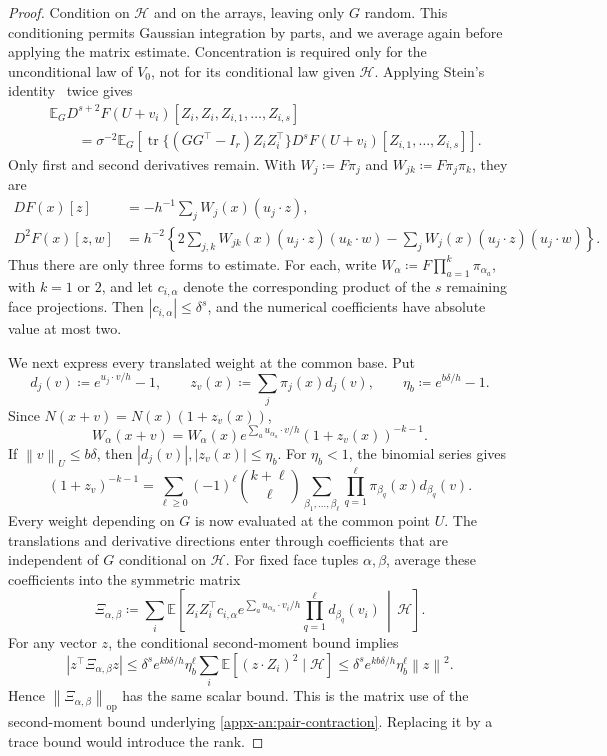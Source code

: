 \documentclass[11pt,letterpaper]{article}
\theoremstyle{remark}
\newcommand{\E}{\mathbb E}
\newcommand{\tr}{\operatorname{tr}}
\newcommand{\op}{\mathrm{op}}
\newcommand{\norm}[1]{\left\lVert#1\right\rVert}
\begin{document}
\begin{proof}
Condition on \(\mathcal H\) and on the arrays, leaving only \(G\)
random. This conditioning permits Gaussian integration by parts,
and we average again before applying the matrix estimate. Concentration
is required only for the unconditional law of \(V_0\), not for its
conditional law given \(\mathcal H\). Applying Stein's
identity~\cite{Stein1981} twice gives
\begin{align*}
 &\E_G D^{s+2}F(U+v_i)[Z_i,Z_i,Z_{i,1},\ldots,Z_{i,s}]\\
 &\qquad=\sigma^{-2}\E_G\left[
       \tr\{(GG^\top-I_r)Z_iZ_i^\top\}
       D^sF(U+v_i)[Z_{i,1},\ldots,Z_{i,s}]\right].
\end{align*}
Only first and second derivatives remain. With
\(W_j\coloneqq F\pi_j\) and \(W_{jk}\coloneqq F\pi_j\pi_k\), they are
\begin{align*}
 DF(x)[z]&=-h^{-1}\sum_jW_j(x)(u_j\cdot z),\\
 D^2F(x)[z,w]&=h^{-2}\left\{
       2\sum_{j,k}W_{jk}(x)(u_j\cdot z)(u_k\cdot w)
       -\sum_jW_j(x)(u_j\cdot z)(u_j\cdot w)\right\}.
\end{align*}
Thus there are only three forms to estimate. For each, write
\(W_\alpha\coloneqq F\prod_{a=1}^k\pi_{\alpha_a}\), with \(k=1\) or \(2\),
and let \(c_{i,\alpha}\) denote the corresponding product of the
\(s\) remaining face projections. Then \(|c_{i,\alpha}|\le\delta^s\),
and the numerical coefficients have absolute value at most two.

We next express every translated weight at the common base. Put
\[
 d_j(v)\coloneqq e^{u_j\cdot v/h}-1,\qquad
 z_v(x)\coloneqq \sum_j\pi_j(x)d_j(v),\qquad
 \eta_b\coloneqq e^{b\delta/h}-1.
\]
Since \(N(x+v)=N(x)(1+z_v(x))\),
\begin{equation}
 W_\alpha(x+v)=W_\alpha(x)
 e^{\sum_a u_{\alpha_a}\cdot v/h}(1+z_v(x))^{-k-1}.
 \label{eq:weight-translation}
\end{equation}
If \(\norm v_U\le b\delta\), then \(|d_j(v)|,|z_v(x)|\le\eta_b\).
For \(\eta_b<1\), the binomial series gives
\[
 (1+z_v)^{-k-1}
 =\sum_{\ell\ge0}(-1)^\ell\binom{k+\ell}{\ell}
       \sum_{\beta_1,\ldots,\beta_\ell}
       \prod_{q=1}^\ell\pi_{\beta_q}(x)d_{\beta_q}(v).
\]
Every weight depending on \(G\) is now evaluated at the common
point \(U\). The translations and derivative directions enter through
coefficients that are independent of \(G\) conditional on
\(\mathcal H\). For fixed face tuples \(\alpha,\beta\), average
these coefficients into the symmetric matrix
\[
 \Xi_{\alpha,\beta}\coloneqq \sum_i\E\left[
 Z_iZ_i^\top c_{i,\alpha}
 e^{\sum_a u_{\alpha_a}\cdot v_i/h}
 \prod_{q=1}^\ell d_{\beta_q}(v_i)\,\middle|\,\mathcal H\right].
\]
For any vector \(z\), the conditional second-moment bound implies
\[
 |z^\top\Xi_{\alpha,\beta}z|
 \le\delta^s e^{kb\delta/h}\eta_b^\ell
       \sum_i\E[(z\cdot Z_i)^2\mid\mathcal H]
 \le\delta^s e^{kb\delta/h}\eta_b^\ell\norm z^2.
\]
Hence \(\norm{\Xi_{\alpha,\beta}}_\op\) has the same scalar bound.
This is the matrix use of the second-moment bound underlying
\eqref{appx-an:pair-contraction}. Replacing it by a trace bound
would introduce the rank.


\end{proof}
\end{document}
